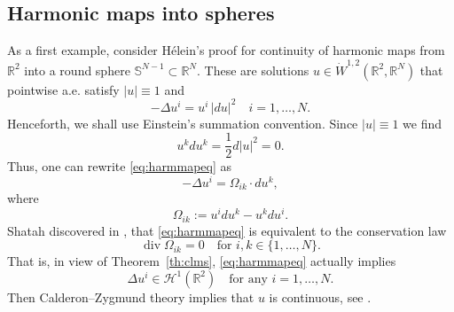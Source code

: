 \documentclass[12pt]{amsart}
\def\S{{\mathbb S}}
\theoremstyle{definition}
\newcommand{\R}{\mathbb{R}}
\numberwithin{theorem}{section} \numberwithin{equation}{section}
\renewcommand{\div}{\operatorname{div}}
\newcommand{\lap}{\Delta }
\begin{document}
\subsection*{Harmonic maps into spheres}
As a first example, consider H\'{e}lein's proof \cite{Helein90} for continuity of harmonic maps from $\R^2$ into a round sphere $\S^{N-1} \subset \R^N$. These are solutions $u \in \dot{W}^{1,2}(\R^2,\R^{N})$ that pointwise a.e. satisfy $|u| \equiv 1$ and
\begin{equation}\label{eq:harmmapeq}
 -\lap u^i = u^i\, |du|^2 \quad \mbox{$i = 1,\ldots,N$}.
\end{equation}
Henceforth, we shall use Einstein's summation convention. Since  $|u| \equiv 1$ we find \[u^k du^k = \frac{1}{2} d|u|^2 = 0.\] Thus, one can rewrite \eqref{eq:harmmapeq} as
\[
 -\lap u^i = \Omega_{ik}\cdot du^k,
\]
where
\begin{equation}\label{eq:omegaharmsphere}
 \Omega_{ik} := u^i du^k-u^k du^i.
\end{equation}
Shatah discovered in \cite{Shatah-1988}, that \eqref{eq:harmmapeq} is equivalent to the conservation law
\begin{equation}\label{eq:heldiv0}
 \div \Omega_{ik}  = 0 \quad \mbox{for }i,k \in \{1,\ldots,N\}.
\end{equation}
That is, in view of Theorem~\ref{th:clms}, \eqref{eq:harmmapeq} actually implies
\[
 \lap u^i \in \mathcal{H}^1(\R^2) \quad \mbox{for any $i = 1,\ldots,N$}.
\]
Then Calderon--Zygmund theory implies that $u$ is continuous, see \cite{Semmes-1994}. 
\end{document}
